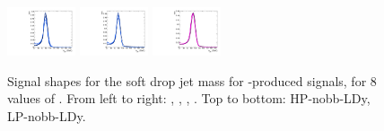 \begin{figure}[htbp]
  \includegraphics[width=0.18\textwidth]{fig/2Dfit/templateSignalVsMX_fromDC_VBFRadToWW_MJJ_mu_LP_nobb_LDy.pdf}
  \includegraphics[width=0.18\textwidth]{fig/2Dfit/templateSignalVsMX_fromDC_VBFZprToWW_MJJ_mu_LP_nobb_LDy.pdf}
  \includegraphics[width=0.18\textwidth]{fig/2Dfit/templateSignalVsMX_fromDC_VBFWprToWZ_MJJ_mu_LP_nobb_LDy.pdf}\\
  \caption{
    Signal shapes for the soft drop jet mass \MJ for \VBF-produced signals, for 8 values of \MX.
    From left to right: \GBulktoWW, \RadtoWW, \ZprtoWW, \WprtoWZ.
    Top to bottom: HP-nobb-LDy, LP-nobb-LDy.
  }
  \label{fig:MJJShapes_VBF_LDy_Run2}
\end{figure}

